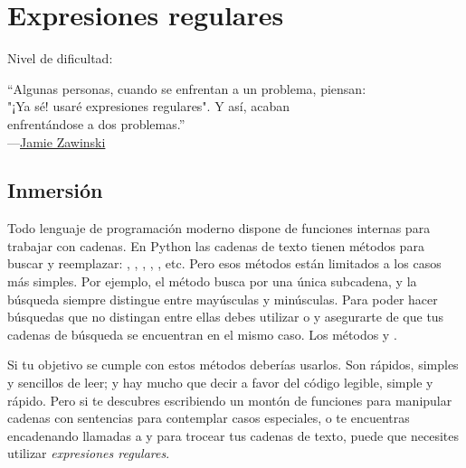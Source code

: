 
\chapter{Expresiones regulares}\label{ch:expresionesregulares}

\noindent
Nivel de dificultad:\diflll

\begin{citaCap}
``Algunas personas, cuando se enfrentan a un problema, piensan: \\
"¡Ya sé! usaré expresiones regulares". Y así, acaban \\
enfrentándose a dos problemas.'' \\
---\href{http://www.jwz.org/hacks/marginal.html}{Jamie Zawinski}
\end{citaCap}

\section{Inmersión}

Todo lenguaje de programación moderno dispone de funciones internas para trabajar con cadenas. En Python las cadenas de texto tienen métodos para buscar y reemplazar: , , , , , etc. Pero esos métodos están limitados a los casos más simples. Por ejemplo, el método  busca por una única subcadena, y la búsqueda siempre distingue entre mayúsculas y minúsculas. Para poder hacer búsquedas que no distingan entre ellas debes utilizar  o  y asegurarte de que tus cadenas de búsqueda se encuentran en el mismo caso. Los métodos  y .

Si tu objetivo se cumple con estos métodos deberías usarlos. Son rápidos, simples y sencillos de leer; y hay mucho que decir a favor del código legible, simple y rápido. Pero si te descubres escribiendo un montón de funciones para manipular cadenas con sentencias  para contemplar casos especiales, o te encuentras encadenando llamadas a  y  para trocear tus cadenas de texto, puede que necesites utilizar \emph{expresiones regulares}.

